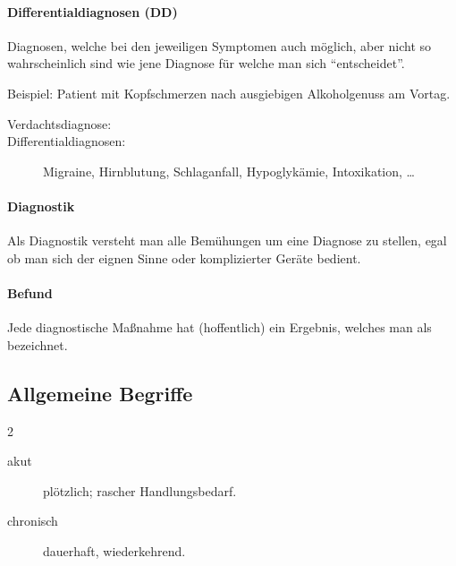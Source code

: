 \paragraph{Differentialdiagnosen (DD)}%
%
Diagnosen, welche bei den jeweiligen Symptomen auch
möglich, aber nicht so wahrscheinlich sind wie jene
Diagnose für welche man sich ``entscheidet''.

Beispiel: Patient mit Kopfschmerzen nach ausgiebigen
Alkoholgenuss am Vortag.
\begin{description}
    \item[Verdachtsdiagnose:] 
    \item[Differentialdiagnosen:]
    Migraine, Hirnblutung, Schlaganfall,
    Hypoglykämie, Intoxikation, \ldots
\end{description}


\paragraph{Diagnostik}

Als Diagnostik versteht man alle Bemühungen um eine Diagnose zu stellen, egal
ob man sich der eignen Sinne oder komplizierter Geräte
bedient.

\paragraph{Befund}

Jede diagnostische Maßnahme hat (hoffentlich) ein Ergebnis, welches man als
 bezeichnet. 



\clearpage
\subsection{Allgemeine Begriffe}

\begin{multicols}{2}


\begin{description}
    \item[akut] plötzlich; rascher Handlungsbedarf.
    \item[chronisch] dauerhaft, wiederkehrend.

\end{description}
\end{multicols}





